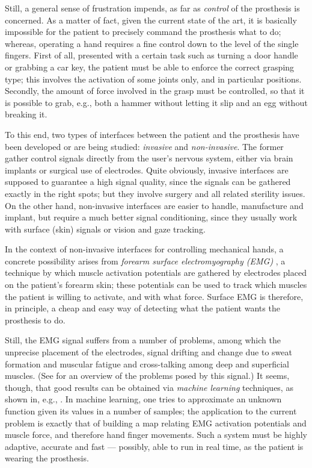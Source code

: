 Still, a general sense of frustration impends, as far as
\emph{control} of the prosthesis is concerned. As a matter of fact,
given the current state of the art, it is basically impossible for the
patient to precisely command the prosthesis what to do; whereas,
operating a hand requires a fine control down to the level of the
single fingers. First of all, presented with a certain task such as
turning a door handle or grabbing a car key, the patient must be able
to enforce the correct grasping type; this involves the activation of
some joints only, and in particular positions. Secondly, the amount of
force involved in the grasp must be controlled, so that it is possible
to grab, e.g., both a hammer without letting it slip and an egg
without breaking it.

To this end, two types of interfaces between the patient and the
prosthesis have been developed or are being studied: \emph{invasive}
and \emph{non-invasive}. The former gather control signals directly
from the user's nervous system, either via brain implants or surgical
use of electrodes. Quite obviously, invasive interfaces are supposed
to guarantee a high signal quality, since the signals can be gathered
exactly in the right spots; but they involve surgery and all related
sterility issues. On the other hand, non-invasive interfaces are
easier to handle, manufacture and implant, but require a much better
signal conditioning, since they usually work with surface (skin)
signals or vision and gaze tracking.

In the context of non-invasive interfaces for controlling mechanical
hands, a concrete possibility arises from \emph{forearm surface
electromyography (EMG)} \cite{zecca}, a technique by which muscle
activation potentials are gathered by electrodes placed on the
patient's forearm skin; these potentials can be used to track which
muscles the patient is willing to activate, and with what force.
Surface EMG is therefore, in principle, a cheap and easy way of
detecting what the patient wants the prosthesis to do.

Still, the EMG signal suffers from a number of problems, among which
the unprecise placement of the electrodes, signal drifting and change
due to sweat formation and muscular fatigue and cross-talking among
deep and superficial muscles. (See \cite{deluca} for an overview of
the problems posed by this signal.) It seems, though, that good
results can be obtained via \emph{machine learning} techniques, as
shown in, e.g., \cite{dunlop,fukuda,smagt}. In machine learning, one
tries to approximate an unknown function given its values in a number
of samples; the application to the current problem is exactly that of
building a map relating EMG activation potentials and muscle force,
and therefore hand finger movements. Such a system must be highly
adaptive, accurate and fast --- possibly, able to run in real time, as
the patient is wearing the prosthesis.

